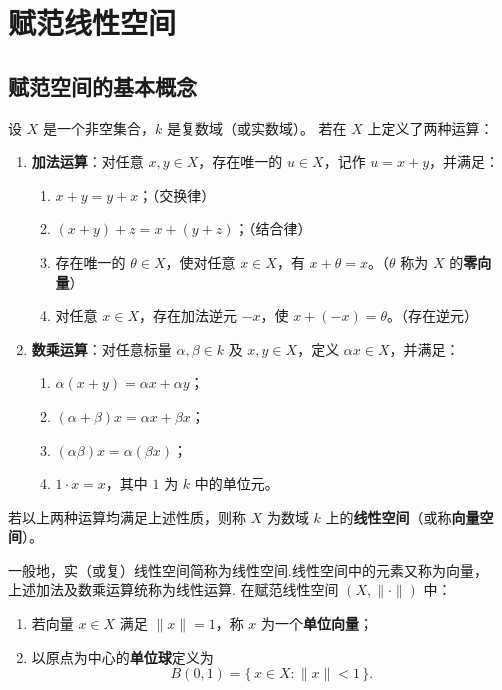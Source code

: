 \chapter{赋范线性空间}
\section{ 赋范空间的基本概念
}
\begin{definition}[线性空间]
设 $X$ 是一个非空集合，$k$ 是复数域（或实数域）。
若在 $X$ 上定义了两种运算：

\begin{enumerate}
  \item[\textbf{(1)}] \textbf{加法运算}：对任意 $x,y \in X$，存在唯一的 $u \in X$，记作 $u = x + y$，并满足：
  \begin{enumerate}
    \item $x + y = y + x$；\hfill（交换律）
    \item $(x + y) + z = x + (y + z)$；\hfill（结合律）
    \item 存在唯一的 $\theta \in X$，使对任意 $x \in X$，有 $x + \theta = x$。\hfill（$\theta$ 称为 $X$ 的\textbf{零向量}）
    \item 对任意 $x \in X$，存在加法逆元 $-x$，使 $x + (-x) = \theta$。\hfill（存在逆元）
  \end{enumerate}

  \item[\textbf{(2)}] \textbf{数乘运算}：对任意标量 $\alpha,\beta \in k$ 及 $x,y \in X$，定义 $\alpha x \in X$，并满足：
  \begin{enumerate}
    \item $\alpha(x+y) = \alpha x + \alpha y$；
    \item $(\alpha + \beta)x = \alpha x + \beta x$；
    \item $(\alpha\beta)x = \alpha(\beta x)$；
    \item $1 \cdot x = x$，其中 $1$ 为 $k$ 中的单位元。
  \end{enumerate}
\end{enumerate}

若以上两种运算均满足上述性质，则称 $X$ 为数域 $k$ 上的\textbf{线性空间}（或称\textbf{向量空间}）。
\end{definition}
\begin{remark}
    一般地，实（或复）线性空间简称为线性空间.线性空间中的元素又称为向量，\\上述加法及数乘运算统称为线性运算. 
在赋范线性空间 $(X, \|\cdot\|)$ 中：

\begin{enumerate}
  \item 若向量 $x \in X$ 满足 $\|x\| = 1$，称 $x$ 为一个\textbf{单位向量}；
  \item 以原点为中心的\textbf{单位球}定义为
  \[
  B(0,1) = \{\, x \in X : \|x\| < 1 \,\}.
  \]
\end{enumerate}
\end{remark}
